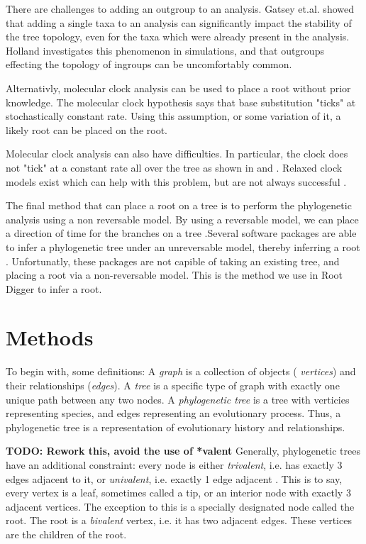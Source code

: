 \documentclass{article}
\begin{document}
There are challenges to adding  an  outgroup  to  an  analysis.   Gatsey  et.al.
\cite{gatesy_how_2007} showed that adding a  single  taxa  to  an  analysis  can
significantly impact the stability of the tree topology, even for the taxa which
were already present  in  the  analysis.   Holland  \cite{holland_outgroup_2003}
investigates this phenomenon in simulations, and that  outgroups  effecting  the
topology of ingroups can be uncomfortably common.

Alternativly, molecular clock analysis can be used to place a root without prior
knowledge. The molecular clock hypothesis says that base substitution "ticks" at
stochastically constant rate. Using this assumption, or some variation of it, a
likely root can be placed on the root.

Molecular clock analysis can also have difficulties. In particular, the clock
does not "tick" at a constant rate all over the tree as shown in
\cite{steiper_primate_2006} and \cite{li_molecular_1987}. Relaxed clock models
exist which can help with this problem, but are not always successful
\cite{battistuzzi_performance_2010}.

The final method that can place a root on a tree is to perform the phylogenetic
analysis using a non reversable model. By using a reversable model, we can place
a direction of time for the branches on a tree \cite{yap_rooting_2005}.Several
software packages are able to infer a phylogenetic tree under an unreversable
model, thereby inferring a root \cite{nguyen_iq-tree:_2015}
\cite{ronquist_mrbayes_2003}. Unfortunatly, these packages are not capible of
taking an existing tree, and placing a root via a non-reversable model. This is
the method we use in Root Digger to infer a root.

\section{Methods}

To begin with, some definitions: A {\em graph} is a collection of objects ({\em
  vertices}) and their relationships ({\em edges}). A {\em tree} is a specific
  type of graph with exactly one unique path between any two nodes. A {\em
    phylogenetic tree} is a tree with verticies representing species, and edges
    representing an evolutionary process.  Thus, a phylogenetic tree is a
    representation of evolutionary history and relationships.

{\bf TODO: Rework this, avoid the use of *valent}
Generally, phylogenetic trees have an additional constraint: every node is
either {\em trivalent}, i.e. has exactly 3 edges adjacent to it, or {\em
univalent}, i.e. exactly 1 edge adjacent . This is to say, every vertex is a
leaf, sometimes called a tip, or an interior node with exactly 3 adjacent
vertices. The exception to this is a specially designated node called the root.
The root is a {\em bivalent} vertex, i.e. it has two adjacent edges. These
vertices are the children of the root.
\end{document}
